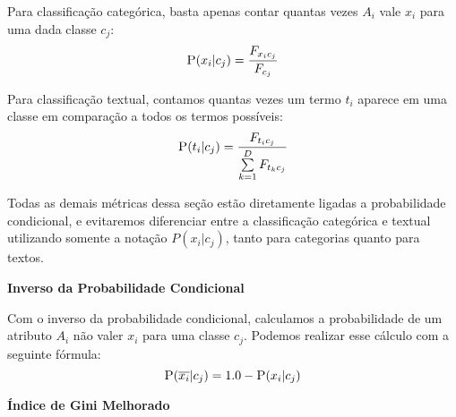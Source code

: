 \begin{description}
Para classificação categórica, basta apenas contar quantas vezes $A_i$ vale $x_i$ para uma dada classe $c_j$:
    \begin{equation}\label{eqn::nbcattexto}
        \textsc{P}(x_i|c_j) = \frac{ F_{x_{i}c_{j}} }{ F_{c_{j}} } 
    \end{equation}
        
Para classificação textual, contamos quantas vezes um termo $t_i$ aparece em uma classe em comparação a todos os termos possíveis:
    \begin{equation}\label{eqn::nbcattexto}
       \textsc{P}(t_i|c_j) = \frac{ F_{t_{i}c_{j}} }{ \sum\limits^{D}_{k = 1} {  F_{t_{k}c_{j}}} } 
    \end{equation}

Todas as demais métricas dessa seção estão diretamente ligadas a probabilidade condicional, e evitaremos diferenciar entre a classificação categórica e textual utilizando somente a notação $P(x_i|c_j)$, tanto para categorias quanto para textos.


\item{\textbf{Inverso da Probabilidade Condicional}}%
\label{item::pc'}

Com o inverso da probabilidade condicional, calculamos a probabilidade de um atributo $A_i$ não valer $x_i$ para uma classe $c_j$. Podemos realizar esse cálculo com a seguinte fórmula:
\begin{equation}\label{eqn::plinhattalquec}
 \textsc{P}(\overline{x_i}|c_j) = 1.0 - \textsc{P}(x_i|c_j)
\end{equation}

\item{\textbf{Índice de Gini Melhorado}} %
\label{item::gini}


\end{description}
